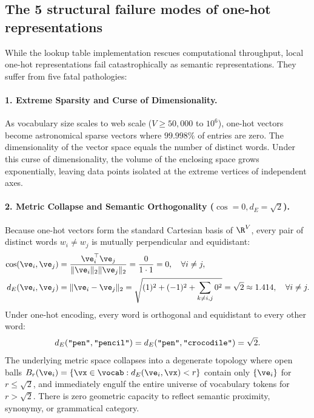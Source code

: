 \documentclass[../../main.tex]{subfiles}
\begin{document}
\subsection{The 5 structural failure modes of one-hot representations}
\label{subsec:five_failure_modes}

While the lookup table implementation rescues computational throughput, local one-hot representations fail catastrophically as semantic representations. They suffer from five fatal pathologies:

\paragraph{1. Extreme Sparsity and Curse of Dimensionality.}
As vocabulary size scales to web scale ($V \ge 50{,}000$ to $10^6$), one-hot vectors become astronomical sparse vectors where $99.998\%$ of entries are zero. The dimensionality of the vector space equals the number of distinct words. Under this curse of dimensionality, the volume of the enclosing space grows exponentially, leaving data points isolated at the extreme vertices of independent axes.

\paragraph{2. Metric Collapse and Semantic Orthogonality ($\cos = 0, d_E = \sqrt{2}$).}
Because one-hot vectors form the standard Cartesian basis of $\R^V$, every pair of distinct words $w_i \neq w_j$ is mutually perpendicular and equidistant:
\begin{align}
\label{eq:onehot_cosine}
\cos(\ve_i, \ve_j) &= \frac{\ve_i^\top \ve_j}{\|\ve_i\|_2 \|\ve_j\|_2} = \frac{0}{1 \cdot 1} = 0, \quad \forall i \neq j, \\
\label{eq:onehot_l2}
d_E(\ve_i, \ve_j) &= \|\ve_i - \ve_j\|_2 = \sqrt{(1)^2 + (-1)^2 + \sum_{k \neq i, j} 0^2} = \sqrt{2} \approx 1.414, \quad \forall i \neq j.
\end{align}
Under one-hot encoding, every word is orthogonal and equidistant to every other word:
\begin{equation}
\label{eq:equidistance_paradox}
d_E(\text{\texttt{"pen"}}, \text{\texttt{"pencil"}}) = d_E(\text{\texttt{"pen"}}, \text{\texttt{"crocodile"}}) = \sqrt{2}.
\end{equation}
The underlying metric space collapses into a degenerate topology where open balls $B_r(\ve_i) = \{\vx \in \vocab : d_E(\ve_i, \vx) < r\}$ contain only $\{\ve_i\}$ for $r \le \sqrt{2}$, and immediately engulf the entire universe of vocabulary tokens for $r > \sqrt{2}$. There is zero geometric capacity to reflect semantic proximity, synonymy, or grammatical category.
\end{document}
